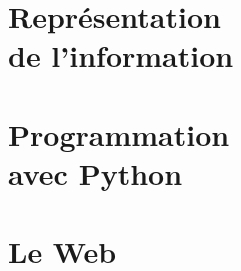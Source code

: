 \documentclass[10pt,a4paper,cours]{nsi}
\begin{document}
\part{Représentation\\ de l'information}






\part{Programmation\\ avec Python}




 
 
 
 
 


 
 
 
 









 
 
 

 \part{Le Web}
\end{document}
